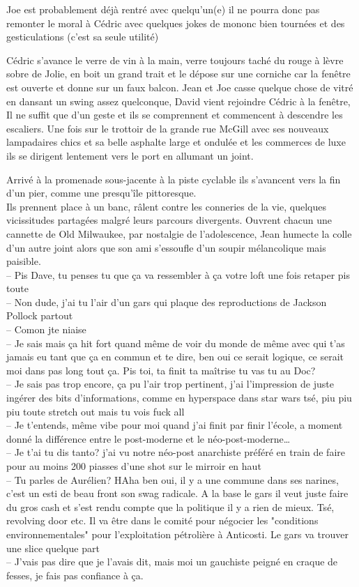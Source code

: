 Joe est probablement déjà rentré avec quelqu'un(e) il ne pourra donc pas
remonter le moral à Cédric avec quelques jokes de mononc bien tournées et des
gesticulations (c'est sa seule utilité)

Cédric s'avance le verre de vin à la main, verre toujours
taché du rouge à lèvre sobre de Jolie, en boit un grand trait et le dépose sur
une corniche car la fenêtre est ouverte et donne sur un faux balcon. Jean et Joe
casse quelque chose de vitré en dansant un swing assez quelconque, David vient
rejoindre Cédric à la fenêtre, Il ne suffit que d'un geste et ils se comprennent
et commencent à descendre les escaliers. Une fois sur le trottoir de la grande
rue McGill avec ses nouveaux lampadaires chics et sa belle asphalte large et
ondulée et les commerces de luxe ils se dirigent lentement vers le port en
allumant un joint. 

Arrivé à la promenade sous-jacente à la piste cyclable ils s'avancent vers la
fin d'un pier, comme une presqu'île pittoresque. \\ Ils prennent place à un
banc, râlent contre les conneries de la vie, quelques vicissitudes partagées
malgré leurs parcours divergents. Ouvrent chacun une cannette de Old Milwaukee,
par nostalgie de l'adolescence, Jean humecte la colle d'un autre joint alors que
son ami s'essoufle d'un soupir mélancolique mais paisible.
\\ -- Pis Dave, tu
penses tu que ça va ressembler à ça votre loft une fois retaper pis toute\\ 
-- Non dude, j'ai tu l'air d'un gars qui plaque des reproductions de Jackson 
Pollock partout \\
-- Comon jte niaise\\
-- Je sais mais ça hit fort quand même de voir du monde de même avec qui
t'as jamais eu tant que ça en commun et te dire, ben oui ce serait logique,
ce serait moi dans pas long tout ça. Pis toi, ta finit ta maîtrise tu vas tu 
au Doc?\\
-- Je sais pas trop encore, ça pu l'air trop pertinent, j'ai l'impression
de juste ingérer des bits d'informations, comme en hyperspace dans star wars 
tsé, piu piu piu toute stretch out mais tu vois fuck all\\
-- Je t'entends, même vibe pour moi quand j'ai finit par finir l'école,
a moment donné la différence entre le post-moderne et le néo-post-moderne\ldots\\
-- Je t'ai tu dis tanto? j'ai vu notre néo-post anarchiste préféré
en train de faire pour au moins 200 piasses d'une shot sur le mirroir en haut\\
-- Tu parles de Aurélien? HAha ben oui, il y a une commune dans ses narines,
c'est un esti de beau front son swag radicale. A la base le gars il veut 
juste faire du gros cash et s'est rendu compte que la politique il y a rien
de mieux. Tsé, revolving door etc. Il va être dans le comité pour négocier 
les "conditions environnementales" pour l'exploitation pétrolière à Anticosti.
Le gars va trouver une slice quelque part\\
-- J'vais pas dire que je l'avais dit, mais moi un gauchiste peigné en craque
de fesses, je fais pas confiance à ça.\\

